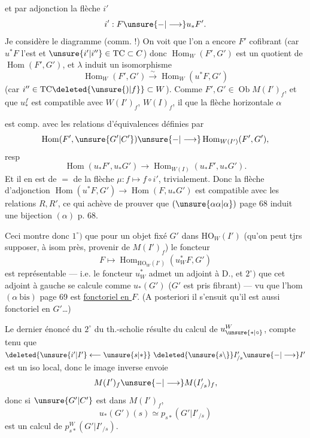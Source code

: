  et par adjonction la flèche $i'$
\[
i':F\unsure{-|\longrightarrow}u_*F'.
\]
Je considère le diagramme (comm. !)
On voit que  l'on a encore $F'$ cofibrant (car $u^*F$ l'est et $\unsure{i'|i''}\in\mathrm{TC}\subset C$) donc $\operatorname{Hom}_W(F',G')$ est un quotient de $\operatorname{Hom}(F',G')$, et $\lambda$ induit un isomorphisme
\[
\operatorname{Hom}_W(F',G')\xrightarrow{\sim}\operatorname{Hom}_W(u^*F,G')
\]
(car $i''\in\mathrm{TC}\deleted{\unsure{)|f}}\subset W$). Comme $F',G'\in\operatorname{Ob}M(I')_f$, et que $u_*^f$ est compatible avec $W(I')_f$, $W(I)_f$, il  que la flèche horizontale $\alpha$

est comp. avec les relations d'équivalences définies par
\[
\operatorname{Hom}(F',\unsure{G'|C'})\unsure{-|\longrightarrow}\operatorname{Hom}_{W(I')}(F',G'),
\]
resp
\[
\operatorname{Hom}(u_*F',u_*G')\longrightarrow\operatorname{Hom}_{W(I)}(u_*F',u_*G').
\]
Et il en est de $=$ de la flèche $\mu:f\mapsto f\circ i'$, trivialement. Donc la flèche d'adjonction $\operatorname{Hom}(u^*F,G')\longrightarrow\operatorname{Hom}(F,u_*G')$ est compatible avec les relations $R,R'$, ce qui achève de prouver que $(\unsure{\alpha\alpha|\alpha})$ page 68 induit une bijection $(\alpha)$ p. 68.

 Ceci montre donc $1^\circ)$ que pour un objet fixé $G'$ dans $\mathrm{HO}_W(I')$ (qu'on peut tjrs supposer, à isom près, provenir de $M(I')_f$) le foncteur
\[
F\longmapsto\operatorname{Hom}_{\mathrm{HO}_W(I')}(u_W^*F,G')
\]
est représentable --- i.e. le foncteur $u_W^*$ admet un adjoint à D., et $2^\circ)$ que cet adjoint à gauche se calcule comme $u_*(G')$
($G'$ est pris fibrant) ---  vu que l'hom $(\alpha\ \text{bis})$ page 69 est \uline{fonctoriel en $F$}. (A posteriori il s'ensuit qu'il est aussi fonctoriel en $G'$\ldots)

Le dernier énoncé du $2^\circ$ du th.-scholie résulte du calcul de $u_{\unsure{*|\circ}}^W$, compte tenu que $\deleted{\unsure{i'|I'}\longleftarrow\unsure{s|*}}\ \deleted{\unsure{s\backslash}}I'_{/s}\unsure{-|\longrightarrow}I'$ est un iso local, donc le  image inverse  envoie
\[
M(I')_f\unsure{-|\longrightarrow}M(I'_{/s})_f,
\]
donc si $\unsure{G'|C'}$ est dans $M(I')_f$,
\[
u_*(G')(s)\simeq p_{s*}(G'|I'_{/s})
\]
est un calcul de $p_{s*}^W(G'|I'_{/s})$.

